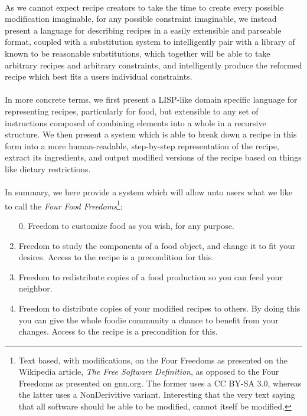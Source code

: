 \paragraph{}
As we cannot expect recipe creators to take the time to create every possible modification imaginable, for any possible constraint imaginable, we instead present a language for describing recipes in a easily extensible and parseable format, coupled with a substitution system to intelligently pair with a library of known to be reasonable substitutions, which together will be able to take arbitrary recipes and arbitrary constraints, and intelligently produce the reformed recipe which best fits a users individual constraints.

\paragraph{}
In more concrete terms, we first present a LISP-like domain specific language for representing recipes, particularly for food, but extensible to any set of instructions composed of combining elements into a whole in a recursive structure. We then present a system which is able to break down a recipe in this form into a more human-readable, step-by-step representation of the recipe, extract its ingredients, and output modified versions of the recipe based on things like dietary restrictions.

\paragraph{}
In summary, we here provide a system which will allow unto users what we like to call the \textit{Four Food Freedoms}\footnote{Text based, with modifications, on the Four Freedoms as presented on the Wikipedia article, \textit{The Free Software Definition}, as opposed to the Four Freedoms as presented on gnu.org. The former uses a CC BY-SA 3.0, whereas the latter uses a NonDerivitive variant. Interesting that the very text saying that all software should be able to be modified, cannot itself be modified.}:
\begin{enumerate}
    \item[0.] Freedom to customize food as you wish, for any purpose.
    \item Freedom to study the components of a food object, and change it to fit your desires. Access to the recipe is a precondition for this.
    \item Freedom to redistribute copies of a food production so you can feed your neighbor.
    \item Freedom to distribute copies of your modified recipes to others. By doing this you can give the whole foodie community a chance to benefit from your changes. Access to the recipe is a precondition for this.
\end{enumerate}

